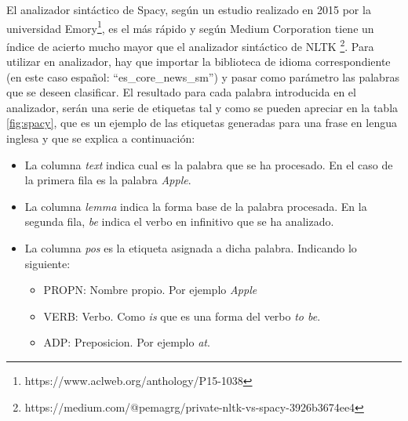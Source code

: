 El analizador sintáctico de Spacy, según un estudio realizado en 2015 por la universidad Emory\footnote{https://www.aclweb.org/anthology/P15-1038}, es el más rápido y según Medium Corporation tiene un índice de acierto mucho mayor que el analizador sintáctico de NLTK \footnote{https://medium.com/@pemagrg/private-nltk-vs-spacy-3926b3674ee4}. Para utilizar en analizador, hay que importar la biblioteca de idioma correspondiente (en este caso español: ``es\_core\_news\_sm'') y pasar como parámetro las palabras que se deseen clasificar. El resultado para cada palabra introducida en el analizador, serán una serie de etiquetas tal y como se pueden apreciar en la tabla \ref{fig:spacy}, que es un ejemplo de las etiquetas generadas para una frase en lengua inglesa y que se explica a continuación:
\begin{itemize}
	\item La columna \textit{text} indica cual es la palabra que se ha procesado. En el caso de la primera fila es la palabra \textit{Apple}.
	\item La columna \textit{lemma} indica la forma base de la palabra procesada. En la segunda fila, \textit{be} indica el verbo en infinitivo que se ha analizado.
	\item La columna \textit{pos} es la etiqueta asignada a dicha palabra. Indicando lo siguiente:
		\begin{itemize}
			\item PROPN: Nombre propio. Por ejemplo \textit{Apple}
			\item VERB: Verbo. Como \textit{is} que es una forma del verbo \textit{to be}.
			\item ADP: Preposicion. Por ejemplo \textit{at}.
		\end{itemize}
	

\end{itemize}
